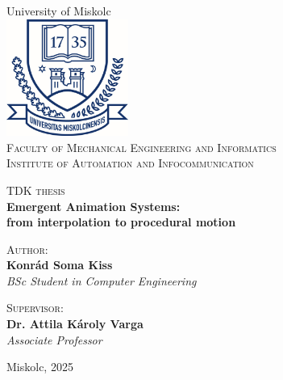 \begin{titlepage}
    \centering

    \vspace*{2cm}

    University of Miskolc\\
    \includegraphics[width=0.3\textwidth]{./img/university-logo.jpg}\\
    {\scshape Faculty of Mechanical Engineering and Informatics}\\
    {\scshape Institute of Automation and Infocommunication}\\

    \vspace{2cm}

    {\normalsize \scshape TDK thesis}\\
    {\small \bfseries Emergent Animation Systems:\\ from interpolation to procedural motion}\\

    \vspace*{\fill}

    {\normalsize \scshape Author:}\\
    {\small \bfseries Konrád Soma Kiss}\\
    \textit{\small  BSc Student in Computer Engineering}\\

    \vspace{2cm}

    {\normalsize \scshape Supervisor:}\\
    {\small \bfseries Dr. Attila Károly Varga}\\
    \textit{\small Associate Professor}\\

    \vspace{2cm}
    
    {\small Miskolc, 2025}\\
\end{titlepage}